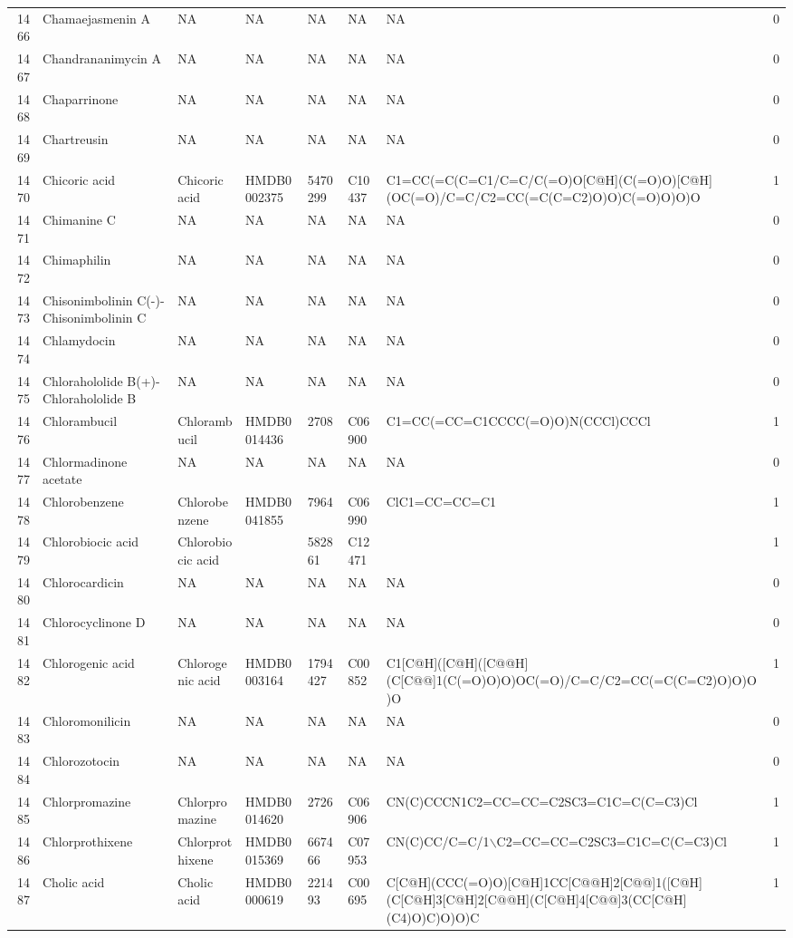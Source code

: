 \documentclass[a4paper]{article}
\begin{document}
\begin{longtable}{rlllllll}
  1466 & Chamaejasmenin A & NA & NA & NA & NA & NA & 0 \\ 
  1467 & Chandrananimycin A & NA & NA & NA & NA & NA & 0 \\ 
  1468 & Chaparrinone & NA & NA & NA & NA & NA & 0 \\ 
  1469 & Chartreusin & NA & NA & NA & NA & NA & 0 \\ 
  1470 & Chicoric acid & Chicoric acid & HMDB0002375 & 5470299 & C10437 & C1=CC(=C(C=C1/C=C/C(=O)O[C@H](C(=O)O)[C@H](OC(=O)/C=C/C2=CC(=C(C=C2)O)O)C(=O)O)O)O & 1 \\ 
  1471 & Chimanine C & NA & NA & NA & NA & NA & 0 \\ 
  1472 & Chimaphilin & NA & NA & NA & NA & NA & 0 \\ 
  1473 & Chisonimbolinin C(-)-Chisonimbolinin C & NA & NA & NA & NA & NA & 0 \\ 
  1474 & Chlamydocin & NA & NA & NA & NA & NA & 0 \\ 
  1475 & Chlorahololide B(+)-Chlorahololide B & NA & NA & NA & NA & NA & 0 \\ 
  1476 & Chlorambucil & Chlorambucil & HMDB0014436 & 2708 & C06900 & C1=CC(=CC=C1CCCC(=O)O)N(CCCl)CCCl & 1 \\ 
  1477 & Chlormadinone acetate & NA & NA & NA & NA & NA & 0 \\ 
  1478 & Chlorobenzene & Chlorobenzene & HMDB0041855 & 7964 & C06990 & ClC1=CC=CC=C1 & 1 \\ 
  1479 & Chlorobiocic acid & Chlorobiocic acid &  & 582861 & C12471 &  & 1 \\ 
  1480 & Chlorocardicin & NA & NA & NA & NA & NA & 0 \\ 
  1481 & Chlorocyclinone D & NA & NA & NA & NA & NA & 0 \\ 
  1482 & Chlorogenic acid & Chlorogenic acid & HMDB0003164 & 1794427 & C00852 & C1[C@H]([C@H]([C@@H](C[C@@]1(C(=O)O)O)OC(=O)/C=C/C2=CC(=C(C=C2)O)O)O)O & 1 \\ 
  1483 & Chloromonilicin & NA & NA & NA & NA & NA & 0 \\ 
  1484 & Chlorozotocin & NA & NA & NA & NA & NA & 0 \\ 
  1485 & Chlorpromazine & Chlorpromazine & HMDB0014620 & 2726 & C06906 & CN(C)CCCN1C2=CC=CC=C2SC3=C1C=C(C=C3)Cl & 1 \\ 
  1486 & Chlorprothixene & Chlorprothixene & HMDB0015369 & 667466 & C07953 & CN(C)CC/C=C/1$\backslash$C2=CC=CC=C2SC3=C1C=C(C=C3)Cl & 1 \\ 
  1487 & Cholic acid & Cholic acid & HMDB0000619 & 221493 & C00695 & C[C@H](CCC(=O)O)[C@H]1CC[C@@H]2[C@@]1([C@H](C[C@H]3[C@H]2[C@@H](C[C@H]4[C@@]3(CC[C@H](C4)O)C)O)O)C & 1 \\ 

\end{longtable}
\end{document}
